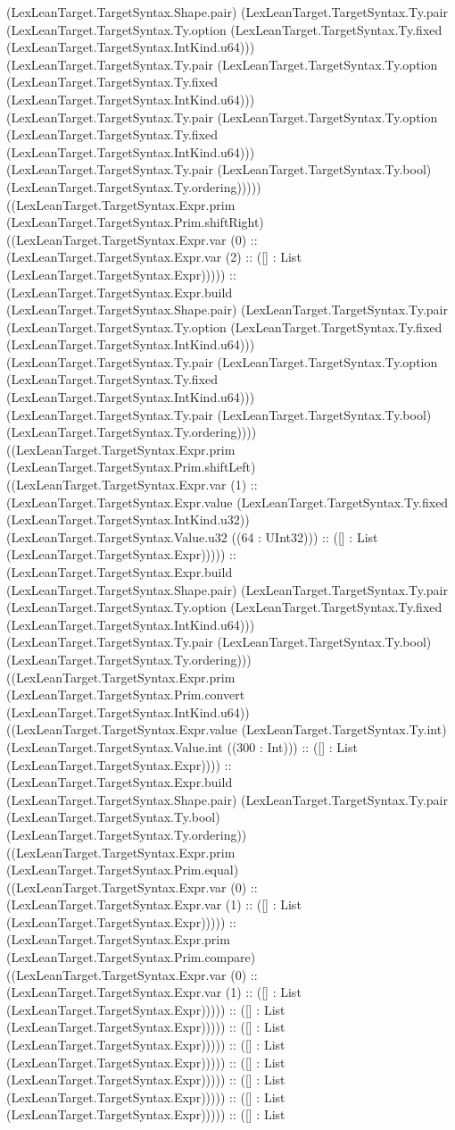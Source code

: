 \documentclass[11pt]{article}
\begin{document}
(LexLeanTarget.TargetSyntax.Shape.pair) (LexLeanTarget.TargetSyntax.Ty.pair (LexLeanTarget.TargetSyntax.Ty.option (LexLeanTarget.TargetSyntax.Ty.fixed (LexLeanTarget.TargetSyntax.IntKind.u64))) (LexLeanTarget.TargetSyntax.Ty.pair (LexLeanTarget.TargetSyntax.Ty.option (LexLeanTarget.TargetSyntax.Ty.fixed (LexLeanTarget.TargetSyntax.IntKind.u64))) (LexLeanTarget.TargetSyntax.Ty.pair (LexLeanTarget.TargetSyntax.Ty.option (LexLeanTarget.TargetSyntax.Ty.fixed (LexLeanTarget.TargetSyntax.IntKind.u64))) (LexLeanTarget.TargetSyntax.Ty.pair (LexLeanTarget.TargetSyntax.Ty.bool) (LexLeanTarget.TargetSyntax.Ty.ordering))))) ((LexLeanTarget.TargetSyntax.Expr.prim (LexLeanTarget.TargetSyntax.Prim.shiftRight) ((LexLeanTarget.TargetSyntax.Expr.var (0) :: (LexLeanTarget.TargetSyntax.Expr.var (2) :: ([] : List (LexLeanTarget.TargetSyntax.Expr))))) :: (LexLeanTarget.TargetSyntax.Expr.build (LexLeanTarget.TargetSyntax.Shape.pair) (LexLeanTarget.TargetSyntax.Ty.pair (LexLeanTarget.TargetSyntax.Ty.option (LexLeanTarget.TargetSyntax.Ty.fixed (LexLeanTarget.TargetSyntax.IntKind.u64))) (LexLeanTarget.TargetSyntax.Ty.pair (LexLeanTarget.TargetSyntax.Ty.option (LexLeanTarget.TargetSyntax.Ty.fixed (LexLeanTarget.TargetSyntax.IntKind.u64))) (LexLeanTarget.TargetSyntax.Ty.pair (LexLeanTarget.TargetSyntax.Ty.bool) (LexLeanTarget.TargetSyntax.Ty.ordering)))) ((LexLeanTarget.TargetSyntax.Expr.prim (LexLeanTarget.TargetSyntax.Prim.shiftLeft) ((LexLeanTarget.TargetSyntax.Expr.var (1) :: (LexLeanTarget.TargetSyntax.Expr.value (LexLeanTarget.TargetSyntax.Ty.fixed (LexLeanTarget.TargetSyntax.IntKind.u32)) (LexLeanTarget.TargetSyntax.Value.u32 ((64 : UInt32))) :: ([] : List (LexLeanTarget.TargetSyntax.Expr))))) :: (LexLeanTarget.TargetSyntax.Expr.build (LexLeanTarget.TargetSyntax.Shape.pair) (LexLeanTarget.TargetSyntax.Ty.pair (LexLeanTarget.TargetSyntax.Ty.option (LexLeanTarget.TargetSyntax.Ty.fixed (LexLeanTarget.TargetSyntax.IntKind.u64))) (LexLeanTarget.TargetSyntax.Ty.pair (LexLeanTarget.TargetSyntax.Ty.bool) (LexLeanTarget.TargetSyntax.Ty.ordering))) ((LexLeanTarget.TargetSyntax.Expr.prim (LexLeanTarget.TargetSyntax.Prim.convert (LexLeanTarget.TargetSyntax.IntKind.u64)) ((LexLeanTarget.TargetSyntax.Expr.value (LexLeanTarget.TargetSyntax.Ty.int) (LexLeanTarget.TargetSyntax.Value.int ((300 : Int))) :: ([] : List (LexLeanTarget.TargetSyntax.Expr)))) :: (LexLeanTarget.TargetSyntax.Expr.build (LexLeanTarget.TargetSyntax.Shape.pair) (LexLeanTarget.TargetSyntax.Ty.pair (LexLeanTarget.TargetSyntax.Ty.bool) (LexLeanTarget.TargetSyntax.Ty.ordering)) ((LexLeanTarget.TargetSyntax.Expr.prim (LexLeanTarget.TargetSyntax.Prim.equal) ((LexLeanTarget.TargetSyntax.Expr.var (0) :: (LexLeanTarget.TargetSyntax.Expr.var (1) :: ([] : List (LexLeanTarget.TargetSyntax.Expr))))) :: (LexLeanTarget.TargetSyntax.Expr.prim (LexLeanTarget.TargetSyntax.Prim.compare) ((LexLeanTarget.TargetSyntax.Expr.var (0) :: (LexLeanTarget.TargetSyntax.Expr.var (1) :: ([] : List (LexLeanTarget.TargetSyntax.Expr))))) :: ([] : List (LexLeanTarget.TargetSyntax.Expr))))) :: ([] : List (LexLeanTarget.TargetSyntax.Expr))))) :: ([] : List (LexLeanTarget.TargetSyntax.Expr))))) :: ([] : List (LexLeanTarget.TargetSyntax.Expr))))) :: ([] : List (LexLeanTarget.TargetSyntax.Expr))))) :: ([] : List (LexLeanTarget.TargetSyntax.Expr))))) :: ([] : List 
\end{document}
